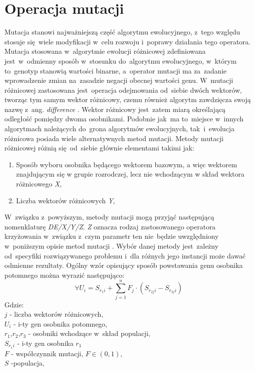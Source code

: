 \chapter{Operacja mutacji}\label{cha:pierwszyDokument}

Mutacja stanowi najważniejszą część algorytmu ewolucyjnego, z~tego względu stosuje się~wiele modyfikacji w~celu rozwoju i~poprawy działania tego operatora.
Mutacja stosowana w~algorytmie ewolucji różnicowej zdefiniowana jest~w~odmienny sposób w~stosunku do~algorytmu ewolucyjnego, w~którym to~genotyp stanowią wartości binarne, a~operator mutacji ma za~zadanie wprowadzenie zmian na~zasadzie negacji obecnej wartości genu. W~mutacji różnicowej zastosowana jest~operacja odejmowania od~siebie dwóch wektorów, tworząc tym samym wektor różnicowy, czemu również algorytm zawdzięcza swoją nazwę z~ang. \textsl{difference} \cite{przystojny_koles}. Wektor różnicowy jest~zatem miarą określającą odległość pomiędzy dwoma osobnikami. Podobnie jak~ma to~miejsce w~innych algorytmach należących do~grona algorytmów ewolucyjnych, tak~i~ewolucja różnicowa posiada wiele alternatywnych metod mutacji. Metody mutacji różnicowej różnią się~od~siebie głównie elementami takimi jak:


\begin{enumerate}
\item Sposób  wyboru osobnika będącego wektorem bazowym, a więc wektorem znajdującym się w grupie rozrodczej, lecz nie wchodzącym w skład wektora różnicowego \textsl{X},
\item Liczba wektorów różnicowych \textsl{Y},
\end{enumerate}
\par
W~związku z~powyższym, metody mutacji mogą przyjąć następującą nomenklaturę \textsl{DE/X/Y/Z}. \textsl{Z} oznacza rodzaj zastosowanego operatora krzyżowania w~związku z~czym parametr ten nie~będzie uwzględniony w~poniższym opisie metod mutacji . Wybór danej metody jest~zależny od~specyfiki rozwiązywanego problemu i~dla różnych jego instancji może dawać odmienne rezultaty. Ogólny wzór opisujący sposób powstawania genu osobnika potomnego można wyrazić następująco:
\begin{equation}
 \forall U_{i} =S_{r_{1}i} + \sum_{j=1}^{n} F_{j} \cdot (S_{r_{2j}i} - S_{r_{3j}i})
\end{equation}
Gdzie:\\
$j$ - liczba wektorów różnicowych,\\
$U_{i}$ - i-ty gen osobnika potomnego,\\
$r_{1}$,$ r_{2}$,$ r_{3}$ - osobniki wchodzące w~skład populacji,\\
$S_{r_{1}i}$ - i-ty gen osobnika $r_{1}$\\
$F$ - współczynnik mutacji, $F \in (0,1)$,\\
$S$ -populacja,\\


